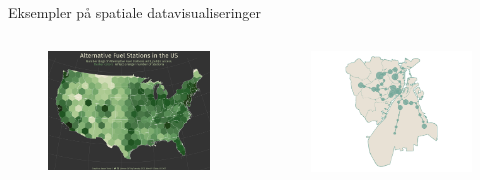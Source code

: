 \documentclass[
  8pt,
  ignorenonframetext,
  aspectratio=169]{beamer}
\newcommand{\columnsbegin}{\begin{columns}}
\newcommand{\columnsend}{\end{columns}}
\begin{document}
\begin{frame}{Eksempler på spatiale datavisualiseringer}
\protect\hypertarget{eksempler-puxe5-spatiale-datavisualiseringer}{}
\columnsbegin


\begin{figure}[H]
    \centering
    \includegraphics[width=.90\textwidth]{pictures/fuel.png}
\end{figure}


\begin{figure}[H]
    \centering
    \includegraphics[width=.90\textwidth]{pictures/Forstadsbilister_start.png}
\end{figure}

\columnsend
\end{frame}
\end{document}
